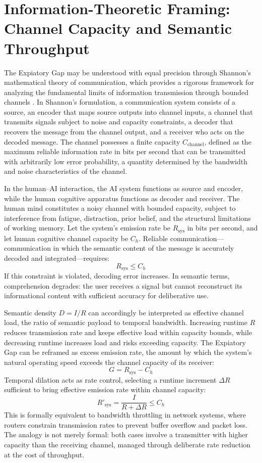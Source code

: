 \documentclass[12pt]{article}
\begin{document}
\section{Information-Theoretic Framing: Channel Capacity and Semantic Throughput}

The Expiatory Gap may be understood with equal precision through Shannon's mathematical theory of communication, which provides a rigorous framework for analyzing the fundamental limits of information transmission through bounded channels \citep{Shannon1948}. In Shannon's formulation, a communication system consists of a source, an encoder that maps source outputs into channel inputs, a channel that transmits signals subject to noise and capacity constraints, a decoder that recovers the message from the channel output, and a receiver who acts on the decoded message. The channel possesses a finite capacity $C_{\text{channel}}$, defined as the maximum reliable information rate in bits per second that can be transmitted with arbitrarily low error probability, a quantity determined by the bandwidth and noise characteristics of the channel.

In the human--AI interaction, the AI system functions as source and encoder, while the human cognitive apparatus functions as decoder and receiver. The human mind constitutes a noisy channel with bounded capacity, subject to interference from fatigue, distraction, prior belief, and the structural limitations of working memory. Let the system's emission rate be $R_{\text{sys}}$ in bits per second, and let human cognitive channel capacity be $C_h$. Reliable communication---communication in which the semantic content of the message is accurately decoded and integrated---requires:
\[
R_{\text{sys}} \le C_h
\]
If this constraint is violated, decoding error increases. In semantic terms, comprehension degrades: the user receives a signal but cannot reconstruct its informational content with sufficient accuracy for deliberative use.

Semantic density $D = I/R$ can accordingly be interpreted as effective channel load, the ratio of semantic payload to temporal bandwidth. Increasing runtime $R$ reduces transmission rate and keeps effective load within capacity bounds, while decreasing runtime increases load and risks exceeding capacity. The Expiatory Gap can be reframed as excess emission rate, the amount by which the system's natural operating speed exceeds the channel capacity of its receiver:
\[
G = R_{\text{sys}} - C_h
\]
Temporal dilation acts as rate control, selecting a runtime increment $\Delta R$ sufficient to bring effective emission rate within channel capacity:
\[
R'_{\text{sys}} = \frac{I}{R + \Delta R} \le C_h
\]
This is formally equivalent to bandwidth throttling in network systems, where routers constrain transmission rates to prevent buffer overflow and packet loss. The analogy is not merely formal: both cases involve a transmitter with higher capacity than the receiving channel, managed through deliberate rate reduction at the cost of throughput.
\end{document}
